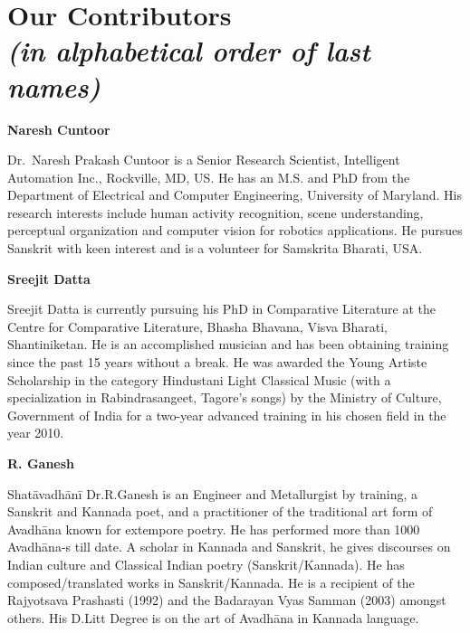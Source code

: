\makeatletter
\def\@makeschapterhead#1{%
  \vspace*{50\p@}%
  {\parindent \z@ \raggedleft
    \normalfont
    \interlinepenalty\@M
    \LARGE \bfseries  #1\par\nobreak
    \vskip 20\p@
  }}
\makeatother

\chapter*{Our Contributors\\ {\rm\sl\small (in alphabetical order of last names)}}\label{contributors}


\chead[]{}
\cfoot[]{}

\hfill {\large\bf Naresh Cuntoor}
\medskip

Dr.~Naresh Prakash Cuntoor is a Senior Research Scientist, Intelligent Automation Inc.,
Rockville, MD, US. He has an M.S. and PhD from the Department of Electrical and
Computer Engineering, University of Maryland. His research interests include human
activity recognition, scene understanding, perceptual organization and computer vision for
robotics applications. He pursues Sanskrit with keen interest and is a volunteer for
Samskrita Bharati, USA.

\bigskip
\hfill {\large\bf Sreejit Datta}
\medskip

Sreejit Datta is currently pursuing his PhD in Comparative Literature at the Centre
for Comparative Literature, Bhasha Bhavana, Visva Bharati, Shantiniketan. He is
an accomplished musician and has been obtaining training since the past 15 years
without a break. He was awarded the Young Artiste Scholarship in the category
Hindustani Light Classical Music (with a specialization in Rabindrasangeet,
Tagore's songs) by the Ministry of Culture, Government of India for a two-year
advanced training in his chosen field in the year 2010.

\bigskip
\hfill {\large\bf R. Ganesh}
\medskip

Shatāvadhānī Dr.\@ R.\@ Ganesh is an Engineer and Metallurgist by training, a Sanskrit and Kannada poet, and a practitioner of the traditional art form of Avadhāna known for extempore poetry. He has performed more than 1000 Avadhāna-s till date. A scholar in Kannada and Sanskrit, he gives discourses on Indian culture and Classical Indian poetry (Sanskrit/Kannada). He has composed/translated works in Sanskrit/Kannada. He is a recipient of the Rajyotsava Prashasti (1992) and the Badarayan Vyas Samman (2003) amongst others. His D.Litt Degree is on the art of
Avadhāna in Kannada language.


